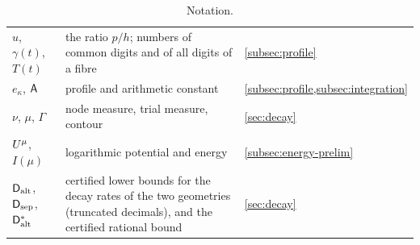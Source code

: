 \begin{table}[ht]
\begin{tabular}{@{}>{\raggedright\arraybackslash}p{}>{\raggedright\arraybackslash}p{}>{\raggedright\arraybackslash}p{}@{}}
$u$, $\gamma(t)$, $T(t)$ & the ratio $p/h$; numbers of common digits and of all digits of a fibre & \cref{subsec:profile}\\
$e_\kappa$, $\mathsf{A}$ & profile and arithmetic constant & \cref{subsec:profile,subsec:integration}\\
$\nu$, $\mu$, $\Gamma$ & node measure, trial measure, contour & \cref{sec:decay}\\
$U^{\mu}$, $I(\mu)$ & logarithmic potential and energy & \cref{subsec:energy-prelim}\\
$\mathsf{D}_{\mathrm{alt}}$, $\mathsf{D}_{\mathrm{sep}}$, $\mathsf{D}^{*}_{\mathrm{alt}}$ & certified lower bounds for the decay rates of the two geometries (truncated decimals), and the certified rational bound & \cref{sec:decay}\\
\bottomrule
\end{tabular}
\caption{Notation.}
\small
\label{tab:notation}
\end{table}
